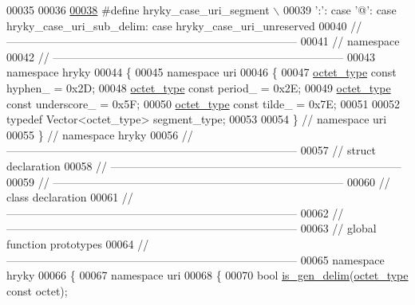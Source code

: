 \begin{DoxyCode}
00035 \textcolor{preprocessor}{}
00036 
\hypertarget{uri__common_8h_source_l00038}{}\hyperlink{uri__common_8h_a24efe8713741bd7b33f727a87f9379b4}{00038} \textcolor{preprocessor}{#define hryky\_case\_uri\_segment \(\backslash\)}
00039 \textcolor{preprocessor}{    ':': case '@': case hryky\_case\_uri\_sub\_delim: case
       hryky\_case\_uri\_unreserved}
00040 \textcolor{preprocessor}{}\textcolor{comment}{//
      ------------------------------------------------------------------------------}
00041 \textcolor{comment}{// namespace}
00042 \textcolor{comment}{//
      ------------------------------------------------------------------------------}
00043 \textcolor{keyword}{namespace }hryky
00044 \{
00045 \textcolor{keyword}{namespace }uri
00046 \{
00047     \hyperlink{namespacehryky_a488cba8b666be33ccca70e819684e3c8}{octet_type} \textcolor{keyword}{const} hyphen\_ =      0x2D;
00048     \hyperlink{namespacehryky_a488cba8b666be33ccca70e819684e3c8}{octet_type} \textcolor{keyword}{const} period\_ =      0x2E;
00049     \hyperlink{namespacehryky_a488cba8b666be33ccca70e819684e3c8}{octet_type} \textcolor{keyword}{const} underscore\_ =  0x5F;
00050     \hyperlink{namespacehryky_a488cba8b666be33ccca70e819684e3c8}{octet_type} \textcolor{keyword}{const} tilde\_ =       0x7E;
00051 
00052     \textcolor{keyword}{typedef} Vector<octet\_type> segment\_type;
00053     
00054 \} \textcolor{comment}{// namespace uri}
00055 \} \textcolor{comment}{// namespace hryky}
00056 \textcolor{comment}{//
      ------------------------------------------------------------------------------}
00057 \textcolor{comment}{// struct declaration}
00058 \textcolor{comment}{//
      ------------------------------------------------------------------------------}
00059 \textcolor{comment}{//
      ------------------------------------------------------------------------------}
00060 \textcolor{comment}{// class declaration}
00061 \textcolor{comment}{//
      ------------------------------------------------------------------------------}
00062 \textcolor{comment}{//
      ------------------------------------------------------------------------------}
00063 \textcolor{comment}{// global function prototypes}
00064 \textcolor{comment}{//
      ------------------------------------------------------------------------------}
00065 \textcolor{keyword}{namespace }hryky
00066 \{
00067 \textcolor{keyword}{namespace }uri
00068 \{
00070     \textcolor{keywordtype}{bool} \hyperlink{namespacehryky_1_1uri_a5eeaf4345e31b2201835c256b5a1d099}{is_gen_delim}(\hyperlink{namespacehryky_a488cba8b666be33ccca70e819684e3c8}{octet_type} \textcolor{keyword}{const} octet);

\end{DoxyCode}
